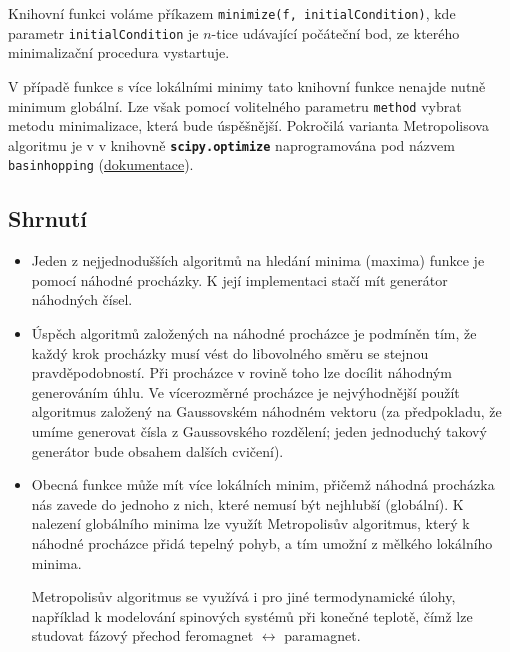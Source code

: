 \documentclass[a4paper,11pt,twoside]{article}
\def\code#1{\textnormal{\texttt{#1}}}
\def\file#1{\textnormal{\textbf{\texttt{#1}}}}
\begin{document}
        \begin{solution}
            Knihovní funkci voláme příkazem \code{minimize(f, initialCondition)}, kde parametr \code{initialCondition} je $n$-tice udávající počáteční bod, ze kterého minimalizační procedura vystartuje.

            V případě funkce s více lokálními minimy tato knihovní funkce nenajde nutně minimum globální.
            Lze však pomocí volitelného parametru \code{method} vybrat metodu minimalizace, která bude úspěšnější.
            Pokročilá varianta Metropolisova algoritmu je v v knihovně \file{scipy.optimize} naprogramována pod názvem \code{basinhopping} (\href{https://docs.scipy.org/doc/scipy/reference/generated/scipy.optimize.basinhopping.html}{dokumentace}).
        \end{solution}

    \subsection{Shrnutí}
        \begin{itemize}
            \item 
                Jeden z nejjednodušších algoritmů na hledání minima (maxima) funkce je pomocí náhodné procházky.
                K její implementaci stačí mít generátor náhodných čísel.

            \item 
                Úspěch algoritmů založených na náhodné procházce je podmíněn tím, že každý krok procházky musí vést do libovolného směru se stejnou pravděpodobností.
                Při procházce v rovině toho lze docílit náhodným generováním úhlu.
                Ve vícerozměrné procházce je nejvýhodnější použít algoritmus založený na Gaussovském náhodném vektoru (za předpokladu, že umíme generovat čísla z Gaussovského rozdělení; jeden jednoduchý takový generátor bude obsahem dalších cvičení).   
            
            \item 
                Obecná funkce může mít více lokálních minim, přičemž náhodná procházka nás zavede do jednoho z nich, které nemusí být nejhlubší (globální).
                K nalezení globálního minima lze využít Metropolisův algoritmus, který k náhodné procházce přidá tepelný pohyb, a tím umožní  z mělkého lokálního minima.  

                Metropolisův algoritmus se využívá i pro jiné termodynamické úlohy, například k modelování spinových systémů při konečné teplotě, čímž lze studovat fázový přechod feromagnet $\leftrightarrow$ paramagnet.
        \end{itemize}
\end{document}
